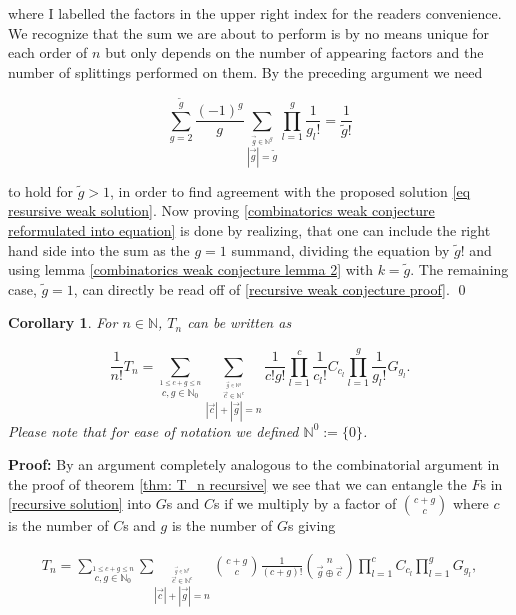 \documentclass[b5paper,draft,openbib,12pt]{memoir}
\newtheorem{Corollary}[Def]{Corollary}
\begin{document}
where I labelled the factors in the upper right index for the readers convenience. We recognize
that the sum we are about to perform is by no means unique for each order of \(n\) but only 
depends on the number of appearing factors and the number of splittings performed on
them. By the preceding argument we need 

\begin{equation}\label{combinatorics weak conjecture reformulated into equation}
\sum_{g=2}^{\tilde{g}} \frac{(-1)^g}{g} \sum_{\stackrel{\vec{g}\in\mathbb{N}^g}{|\vec{g}|=\tilde{g}}} \prod_{l=1}^g \frac{1}{g_l!}
= \frac{1}{\tilde{g}!} 
\end{equation}


to hold for \(\tilde{g}>1\), in order to find agreement with the proposed solution \eqref{eq resursive weak solution}.
Now proving \eqref{combinatorics weak conjecture reformulated into equation} is done by 
realizing, that one can include the right hand side into the sum as the \(g=1\) summand, dividing
the equation by \(\tilde{g}!\) and using lemma \ref{combinatorics weak conjecture lemma 2}
with \(k=\tilde{g}\). The remaining case, \(\tilde{g}=1\), can directly be
read off of \eqref{recursive weak conjecture proof}. \qed

\begin{Corollary}\label{Corollary T_n by G's and C's}
For \(n\in\mathbb{N}\), \(T_n\) can be written as

\begin{equation}
\frac{1}{n!} T_n = \sum_{\stackrel{1\le c+g\le n}{c,g\in\mathbb{N}_0}} 
\sum_{\stackrel{\stackrel{\vec{g}\in\mathbb{N}^g}{\vec{c}\in\mathbb{N}^c}}{|\vec{c}| + |\vec{g}|=n}} 
\frac{1}{c! g!} \prod_{l=1}^c \frac{1}{c_l!} C_{c_l} \prod_{l=1}^g \frac{1}{g_l!} G_{g_l}.
\end{equation}
Please note that for ease of notation we defined \(\mathbb{N}^0:= \{0\}\).
\end{Corollary}
\textbf{Proof:} By an argument completely analogous to the combinatorial argument in the proof of theorem 
\eqref{thm: T_n recursive} we see that we can entangle the \(F\)s in \eqref{recursive solution}
into \(G\)s and \(C\)s if we multiply by a factor of \(\binom{c+g}{c}\) where \(c\) is the 
number of \(C\)s and \(g\) is the number of \(G\)s giving

\begin{multline}
T_n = \sum_{\stackrel{1\le c+g\le n}{c,g\in\mathbb{N}_0}}
\sum_{\stackrel{\stackrel{\vec{g}\in\mathbb{N}^g}{\vec{c}\in\mathbb{N}^c}}{|\vec{c}| + |\vec{g}|=n}} 
\binom{c+g}{c} \frac{1}{(c+g)!} \binom{n}{\vec{g}\oplus \vec{c}}
\prod_{l=1}^c  C_{c_l} \prod_{l=1}^g G_{g_l},
\end{multline}
\end{document}
